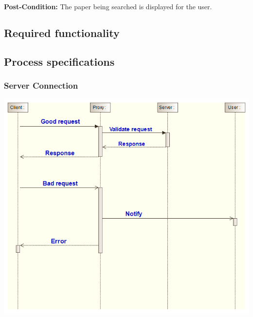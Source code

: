 \documentclass[11pt]{article}
\begin{document}
{\raggedright
	\textbf{Post-Condition: }The paper being searched is displayed for the user.
}

\subsection{Required functionality}

\newpage

\subsection{Process specifications}

\subsubsection{Server Connection}
\begin{center} 
	\includegraphics[width=\textwidth]{../Images/Server_Connection_Sequence_Diagram.png}\\[0.5cm]
\end{center}

\newpage
\end{document}
